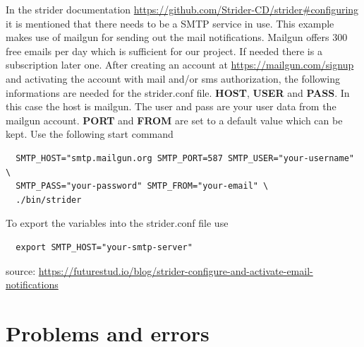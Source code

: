 In the strider documentation \url{https://github.com/Strider-CD/strider#configuring} it is mentioned that there needs to be a SMTP service in use. This
example makes use of mailgun for sending out the mail notifications. Mailgun offers 300 free emails per day which is sufficient for our project. If needed
there is a subscription later one. After creating an account at \url{https://mailgun.com/signup} and activating the account with mail and/or sms authorization,
the following informations are needed for the strider.conf file. \textbf{HOST}, \textbf{USER} and \textbf{PASS}. In this case the host is mailgun. The user
and pass are your user data from the mailgun account. \textbf{PORT} and \textbf{FROM} are set to a default value which can be kept.
Use the following start command

\begin{lstlisting}
  SMTP_HOST="smtp.mailgun.org SMTP_PORT=587 SMTP_USER="your-username" \
  SMTP_PASS="your-password" SMTP_FROM="your-email" \
  ./bin/strider
\end{lstlisting}

To export the variables into the strider.conf file use

\begin{lstlisting}
  export SMTP_HOST="your-smtp-server"
\end{lstlisting}

source: \url{https://futurestud.io/blog/strider-configure-and-activate-email-notifications}

\newpage
\section{Problems and errors}
\label{section:Problems and errors}


